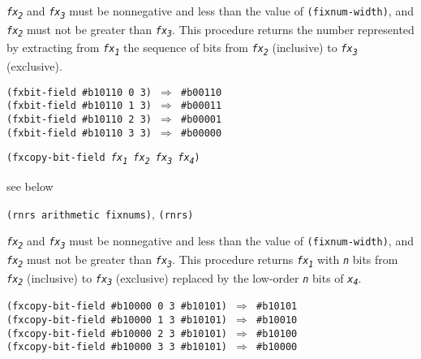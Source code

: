 \texttt{\textit{fx\textsubscript{2}}} and \texttt{\textit{fx\textsubscript{3}}} must be nonnegative and less than the value of
\texttt{(fixnum-width)}, and \texttt{\textit{fx\textsubscript{2}}} must not be greater than \texttt{\textit{fx\textsubscript{3}}}.
This procedure returns the number represented by extracting from \texttt{\textit{fx\textsubscript{1}}}
the sequence of bits from \texttt{\textit{fx\textsubscript{2}}} (inclusive) to \texttt{\textit{fx\textsubscript{3}}} (exclusive).

\begin{alltt}
(fxbit-field \#{}b10110 0 3) \(\Rightarrow\) \#{}b00110
(fxbit-field \#{}b10110 1 3) \(\Rightarrow\) \#{}b00011
(fxbit-field \#{}b10110 2 3) \(\Rightarrow\) \#{}b00001
(fxbit-field \#{}b10110 3 3) \(\Rightarrow\) \#{}b00000
\end{alltt}

\begin{description}

\label{objects_s171}\item[procedure] \texttt{(fxcopy-bit-field \textit{fx\textsubscript{1}} \textit{fx\textsubscript{2}} \textit{fx\textsubscript{3}} \textit{fx\textsubscript{4}})}



\item[returns] see below


\item[libraries] \texttt{(rnrs arithmetic fixnums)}, \texttt{(rnrs)}
\end{description}

\texttt{\textit{fx\textsubscript{2}}} and \texttt{\textit{fx\textsubscript{3}}} must be nonnegative and less than the value of
\texttt{(fixnum-width)}, and \texttt{\textit{fx\textsubscript{2}}} must not be greater than \texttt{\textit{fx\textsubscript{3}}}.
This procedure returns \texttt{\textit{fx\textsubscript{1}}} with \texttt{\textit{n}} bits from \texttt{\textit{fx\textsubscript{2}}} (inclusive) to
\texttt{\textit{fx\textsubscript{3}}} (exclusive) replaced by the low-order \texttt{\textit{n}} bits of \texttt{\textit{x\textsubscript{4}}}.

\begin{alltt}
(fxcopy-bit-field \#{}b10000 0 3 \#{}b10101) \(\Rightarrow\) \#{}b10101
(fxcopy-bit-field \#{}b10000 1 3 \#{}b10101) \(\Rightarrow\) \#{}b10010
(fxcopy-bit-field \#{}b10000 2 3 \#{}b10101) \(\Rightarrow\) \#{}b10100
(fxcopy-bit-field \#{}b10000 3 3 \#{}b10101) \(\Rightarrow\) \#{}b10000
\end{alltt}

